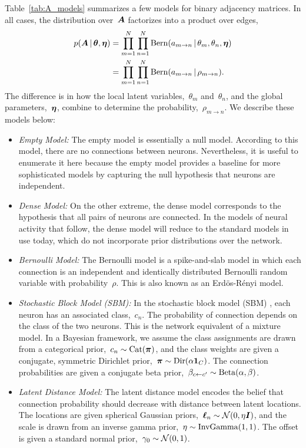 Table~\ref{tab:A_models} summarizes a few models for binary adjacency
matrices. In all cases, the distribution over~$\boldsymbol{A}$ factorizes into a
product over edges,
\begin{align*}
  p(\boldsymbol{A} \,|\, \boldsymbol{\theta}, \boldsymbol{\eta})
  &= \prod_{m=1}^N \prod_{n=1}^N \mathrm{Bern}(a_{m \to n} \,|\, \theta_m, \theta_n, \boldsymbol{\eta}) \\
  &= \prod_{m=1}^N \prod_{n=1}^N \mathrm{Bern}(a_{m \to n} \,|\, \rho_{m \to n}).
\end{align*}
The difference is in how the local latent variables,~$\theta_m$
and~$\theta_n$, and the global parameters,~$\boldsymbol{\eta}$, combine to
determine the probability,~$\rho_{m \to n}$. We describe these models
below:
\begin{itemize}
\item \textit{Empty Model: } The empty model is essentially a null
  model. According to this model, there are no connections between
  neurons. Nevertheless, it is useful to enumerate it here because
  the empty model provides a baseline for more sophisticated models
  by capturing the null hypothesis that neurons are independent. 
  
\item \textit{Dense Model: } On the other extreme, the dense model
  corresponds to the hypothesis that all pairs of neurons are
  connected. In the models of neural activity that follow, the
  dense model will reduce to the standard models in use today, which
  do not incorporate prior distributions over the network.
  
\item \textit{Bernoulli Model: } The Bernoulli model is a
  spike-and-slab model in which each connection is an independent and
  identically distributed Bernoulli random variable with
  probability~$\rho$. This is also known as an Erd\"os-R\'enyi model.
  
\item \textit{Stochastic Block Model (SBM): } In the stochastic block
  model (SBM) \cite{Nowicki-2001}, each neuron has an associated
  class,~$c_n$.  The probability of connection depends on the class of
  the two neurons.  This is the network equivalent of a mixture model.
  In a Bayesian framework, we assume the class assignments are drawn
  from a categorical prior,~${c_n \sim \mathrm{Cat}(\boldsymbol{\pi})}$, and
  the class weights are given a conjugate, symmetric Dirichlet
  prior,~${\boldsymbol{\pi} \sim \mathrm{Dir}(\alpha \boldsymbol{1}_C)}$. The connection
  probabilities are given a conjugate beta prior,~${\beta_{c \leftarrow c'}
    \sim \mathrm{Beta}(\alpha, \beta)}$.
  
\item \textit{Latent Distance Model: } The latent distance model
  \cite{Hoff-2008} encodes the belief that connection probability
  should decrease with distance between latent locations. The
  locations are given spherical Gaussian priors,~$\boldsymbol{\ell}_n \sim
  \mathcal{N}(0, \eta \boldsymbol{I})$, and the scale is drawn from an inverse
  gamma prior,~$\eta \sim \mathrm{InvGamma}(1,1)$. The offset is given a
  standard normal prior,~$\gamma_0 \sim \mathcal{N}(0, 1)$.

\end{itemize}

